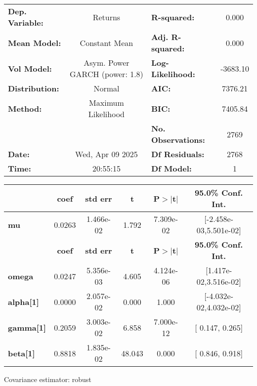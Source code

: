\begin{center}
\begin{tabular}{lclc}
\toprule
\textbf{Dep. Variable:} &            Returns             & \textbf{  R-squared:         } &     0.000   \\
\textbf{Mean Model:}    &         Constant Mean          & \textbf{  Adj. R-squared:    } &     0.000   \\
\textbf{Vol Model:}     & Asym. Power GARCH (power: 1.8) & \textbf{  Log-Likelihood:    } &   -3683.10  \\
\textbf{Distribution:}  &             Normal             & \textbf{  AIC:               } &    7376.21  \\
\textbf{Method:}        &       Maximum Likelihood       & \textbf{  BIC:               } &    7405.84  \\
\textbf{}               &                                & \textbf{  No. Observations:  } &    2769     \\
\textbf{Date:}          &        Wed, Apr 09 2025        & \textbf{  Df Residuals:      } &    2768     \\
\textbf{Time:}          &            20:55:15            & \textbf{  Df Model:          } &     1       \\
\bottomrule
\end{tabular}
\begin{tabular}{lccccc}
            & \textbf{coef} & \textbf{std err} & \textbf{t} & \textbf{P$> |$t$|$} & \textbf{95.0\% Conf. Int.}  \\
\midrule
\textbf{mu} &       0.0263  &    1.466e-02     &     1.792  &      7.309e-02       &   [-2.458e-03,5.501e-02]    \\
                  & \textbf{coef} & \textbf{std err} & \textbf{t} & \textbf{P$> |$t$|$} & \textbf{95.0\% Conf. Int.}  \\
\midrule
\textbf{omega}    &       0.0247  &    5.356e-03     &     4.605  &      4.124e-06       &   [1.417e-02,3.516e-02]     \\
\textbf{alpha[1]} &     0.0000    &    2.057e-02     &   0.000    &          1.000       &   [-4.032e-02,4.032e-02]    \\
\textbf{gamma[1]} &       0.2059  &    3.003e-02     &     6.858  &      7.000e-12       &     [  0.147,  0.265]       \\
\textbf{beta[1]}  &       0.8818  &    1.835e-02     &    48.043  &        0.000         &     [  0.846,  0.918]       \\
\bottomrule
\end{tabular}
\end{center}

Covariance estimator: robust